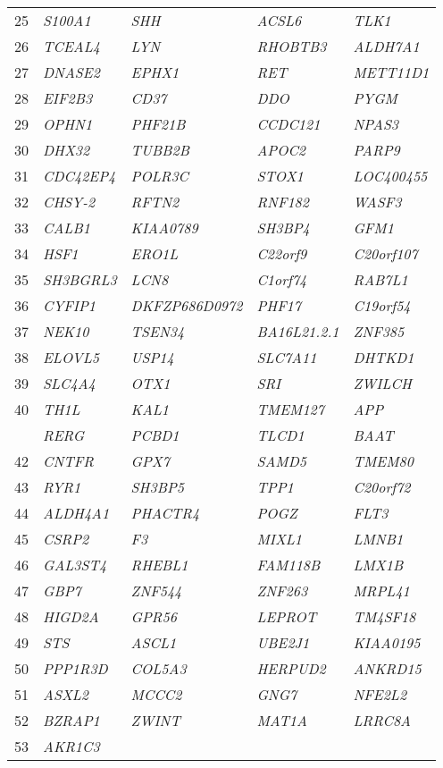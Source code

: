 \documentclass[letterpaper,12pt]{article}
\numberwithin{equation}{appendix}
\begin{document}
\begin{longtable}[c]{r>{\itshape}l>{\itshape}l>{\itshape}l>{\itshape}l}
25&S100A1&SHH&ACSL6&TLK1\tabularnewline
26&TCEAL4&LYN&RHOBTB3&ALDH7A1\tabularnewline
27&DNASE2&EPHX1&RET&METT11D1\tabularnewline
28&EIF2B3&CD37&DDO&PYGM\tabularnewline
29&OPHN1&PHF21B&CCDC121&NPAS3\tabularnewline
30&DHX32&TUBB2B&APOC2&PARP9\tabularnewline
31&CDC42EP4&POLR3C&STOX1&LOC400455\tabularnewline
32&CHSY-2&RFTN2&RNF182&WASF3\tabularnewline
33&CALB1&KIAA0789&SH3BP4&GFM1\tabularnewline
34&HSF1&ERO1L&C22orf9&C20orf107\tabularnewline
35&SH3BGRL3&LCN8&C1orf74&RAB7L1\tabularnewline
36&CYFIP1&DKFZP686D0972&PHF17&C19orf54\tabularnewline
37&NEK10&TSEN34&BA16L21.2.1&ZNF385\tabularnewline
38&ELOVL5&USP14&SLC7A11&DHTKD1\tabularnewline
39&SLC4A4&OTX1&SRI&ZWILCH\tabularnewline
40&TH1L&KAL1&TMEM127&APP\tabularnewline
\newpage
41&RERG&PCBD1&TLCD1&BAAT\tabularnewline
42&CNTFR&GPX7&SAMD5&TMEM80\tabularnewline
43&RYR1&SH3BP5&TPP1&C20orf72\tabularnewline
44&ALDH4A1&PHACTR4&POGZ&FLT3\tabularnewline
45&CSRP2&F3&MIXL1&LMNB1\tabularnewline
46&GAL3ST4&RHEBL1&FAM118B&LMX1B\tabularnewline
47&GBP7&ZNF544&ZNF263&MRPL41\tabularnewline
48&HIGD2A&GPR56&LEPROT&TM4SF18\tabularnewline
49&STS&ASCL1&UBE2J1&KIAA0195\tabularnewline
50&PPP1R3D&COL5A3&HERPUD2&ANKRD15\tabularnewline
51&ASXL2&MCCC2&GNG7&NFE2L2\tabularnewline
52&BZRAP1&ZWINT&MAT1A&LRRC8A\tabularnewline
53&AKR1C3&&&\tabularnewline
\bottomrule
\end{longtable}
\end{document}
